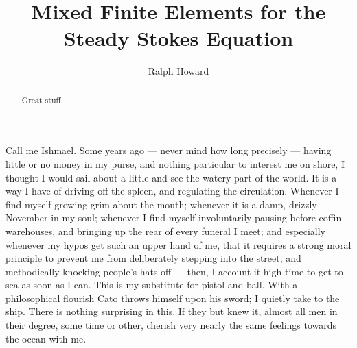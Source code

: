 \documentclass{amsart}
\theoremstyle{definition}
\theoremstyle{remark}
\numberwithin{equation}{section}
\begin{document}

\title{Mixed Finite Elements for the Steady Stokes Equation}


\author{Ralph Howard}
\address{Department of Mathematics, University of South Carolina, 
Columbia, SC 29208}





\begin{abstract}
Great stuff.
\end{abstract}







Call me Ishmael. Some years ago --- never mind how long precisely ---
having little or no money in my purse, and nothing particular to
interest me on shore, I thought I would sail about a little and see
the watery part of the world. It is a way I have of driving off the
spleen, and regulating the circulation.  Whenever I find myself
growing grim about the mouth; whenever it is a damp, drizzly November
in my soul; whenever I find myself involuntarily pausing before coffin
warehouses, and bringing up the rear of every funeral I meet; and
especially whenever my hypos get such an upper hand of me, that it
requires a strong moral principle to prevent me from deliberately
stepping into the street, and methodically knocking people's hats off
--- then, I account it high time to get to sea as soon as I can. This
is my substitute for pistol and ball. With a philosophical flourish
Cato throws himself upon his sword; I quietly take to the ship. There
is nothing surprising in this. If they but knew it, almost all men in
their degree, some time or other, cherish very nearly the same
feelings towards the ocean with me.
\end{document}
